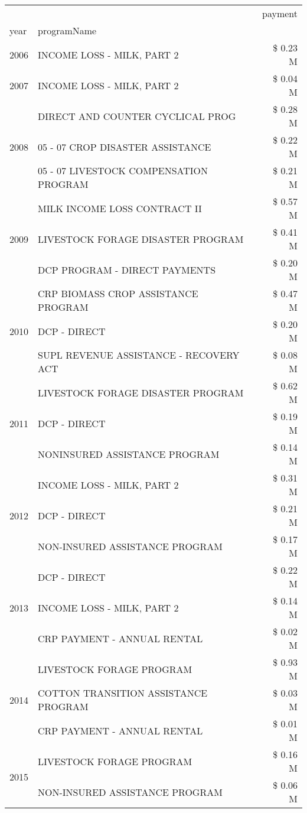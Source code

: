 \begin{tabular}{llr}
\toprule
 &  & payment \\
year & programName &  \\
\midrule
2006 & INCOME LOSS - MILK, PART 2 & \$ 0.23 M \\
\cline{1-3}
2007 & INCOME LOSS - MILK, PART 2 & \$ 0.04 M \\
\cline{1-3}
\multirow[t]{3}{*}{2008} & DIRECT AND COUNTER CYCLICAL PROG & \$ 0.28 M \\
 & 05 - 07 CROP DISASTER ASSISTANCE & \$ 0.22 M \\
 & 05 - 07 LIVESTOCK COMPENSATION PROGRAM & \$ 0.21 M \\
\cline{1-3}
\multirow[t]{3}{*}{2009} & MILK INCOME LOSS CONTRACT II & \$ 0.57 M \\
 & LIVESTOCK FORAGE DISASTER  PROGRAM & \$ 0.41 M \\
 & DCP PROGRAM - DIRECT PAYMENTS & \$ 0.20 M \\
\cline{1-3}
\multirow[t]{3}{*}{2010} & CRP BIOMASS CROP ASSISTANCE PROGRAM & \$ 0.47 M \\
 & DCP - DIRECT & \$ 0.20 M \\
 & SUPL REVENUE ASSISTANCE - RECOVERY ACT & \$ 0.08 M \\
\cline{1-3}
\multirow[t]{3}{*}{2011} & LIVESTOCK FORAGE DISASTER PROGRAM & \$ 0.62 M \\
 & DCP - DIRECT & \$ 0.19 M \\
 & NONINSURED ASSISTANCE PROGRAM & \$ 0.14 M \\
\cline{1-3}
\multirow[t]{3}{*}{2012} & INCOME LOSS - MILK, PART 2 & \$ 0.31 M \\
 & DCP - DIRECT & \$ 0.21 M \\
 & NON-INSURED ASSISTANCE PROGRAM & \$ 0.17 M \\
\cline{1-3}
\multirow[t]{3}{*}{2013} & DCP - DIRECT & \$ 0.22 M \\
 & INCOME LOSS - MILK, PART 2 & \$ 0.14 M \\
 & CRP PAYMENT - ANNUAL RENTAL & \$ 0.02 M \\
\cline{1-3}
\multirow[t]{3}{*}{2014} & LIVESTOCK FORAGE PROGRAM & \$ 0.93 M \\
 & COTTON TRANSITION ASSISTANCE PROGRAM & \$ 0.03 M \\
 & CRP PAYMENT - ANNUAL RENTAL & \$ 0.01 M \\
\cline{1-3}
\multirow[t]{3}{*}{2015} & LIVESTOCK FORAGE PROGRAM & \$ 0.16 M \\
 & NON-INSURED ASSISTANCE PROGRAM & \$ 0.06 M \\

\end{tabular}
